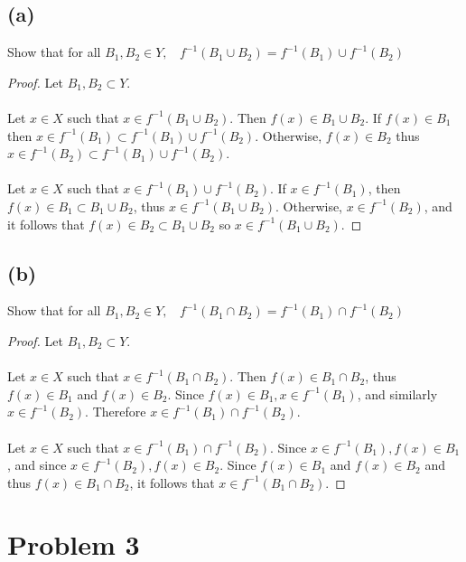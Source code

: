 \documentclass{article}
\begin{document}
\subsection*{(a)}
Show that for all $B_1, B_2 \in Y, \ \ \ \ f^{-1}(B_1 \cup B_2) = f^{-1}(B_1) \cup f^{-1}(B_2)$
\begin{proof}
    Let $B_1, B_2 \subset Y$.
    \\\\
    \fbox{$\subset$}
    Let $x \in X$ such that $x \in f^{-1}(B_1 \cup B_2)$.
    Then $f(x) \in B_1 \cup B_2$.
    If $f(x) \in B_1$ then $x \in f^{-1}(B_1) \subset f^{-1}(B_1) \cup f^{-1}(B_2)$.
    Otherwise, $f(x) \in B_2$ thus $x \in f^{-1}(B_2) \subset f^{-1}(B_1) \cup f^{-1}(B_2)$.
    \\\\
    \fbox{$\supset$}
    Let $x \in X$ such that $x \in f^{-1}(B_1) \cup f^{-1}(B_2)$.
    If $x \in f^{-1}(B_1)$, then $f(x) \in B_1 \subset B_1 \cup B_2$, thus $x \in f^{-1}(B_1 \cup B_2)$.
    Otherwise, $x \in f^{-1}(B_2)$, and it follows that $f(x) \in B_2 \subset B_1 \cup B_2$ so $x \in f^{-1}(B_1 \cup B_2)$.
\end{proof}
\subsection*{(b)}
Show that for all $B_1, B_2 \in Y, \ \ \ \ f^{-1}(B_1 \cap B_2) = f^{-1}(B_1) \cap f^{-1}(B_2)$
\begin{proof}
    Let $B_1, B_2 \subset Y$.
    \\\\
    \fbox{$\subset$}
    Let $x \in X$ such that $x \in f^{-1}(B_1 \cap B_2)$.
    Then $f(x) \in B_1 \cap B_2$, thus $f(x) \in B_1$ and $f(x) \in B_2$.
    Since $f(x) \in B_1, x \in f^{-1}(B_1)$, and similarly $x \in f^{-1}(B_2)$.
    Therefore $x \in f^{-1}(B_1) \cap f^{-1}(B_2)$.
    \\\\
    \fbox{$\supset$}
    Let $x \in X$ such that $x \in f^{-1}(B_1) \cap f^{-1}(B_2)$.
    Since $x \in f^{-1}(B_1), f(x) \in B_1$, and since $x \in f^{-1}(B_2), f(x) \in B_2$.
    Since $f(x) \in B_1$ and $f(x) \in B_2$ and thus $f(x) \in B_1 \cap B_2$, it follows that $x \in f^{-1}(B_1 \cap B_2)$.
\end{proof}
\section*{Problem 3}
\end{document}
